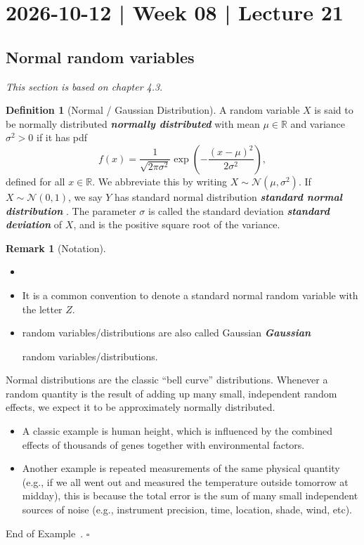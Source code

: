\documentclass[10pt]{article}
\theoremstyle{definition}
\newtheorem{definition}[theorem]{Definition}
\newtheorem{remark}[theorem]{Remark}
\newtheorem{example}[theorem]{Example}
\renewenvironment{example}
{\begin{oldexample}}
  {\par\smallskip\hfill   End of Example~\theexample. $\square$    \par\end{oldexample}}
\newcommand{\1}[1]{\textbf{1}_{\left[#1\right]}} %
\def\R{\mathbb{R}} %
\DeclareRobustCommand{\demph}[1]{%
  \ifmmode
  {\color{Blue}#1}%
  \else
  {\color{Blue}\bfseries\slshape #1}%
  \fi
}
\begin{document}
\newpage
\section{2026-10-12 | Week 08 | Lecture 21}


\subsection{Normal random variables}
\textit{This section is based on chapter 4.3}.


\begin{definition}[Normal / Gaussian Distribution]
  \label{def:gaussian-distribution}
  A random variable $X$ is said to be \demph{normally distributed} with mean
  $\mu\in \R$ and variance $\sigma^{2}>0$ if it has pdf
  \begin{equation*}
    f(x) = \frac{1}{\sqrt{2\pi\sigma^{2}}}
    \exp\left(-\frac{(x-\mu)^{2}}{2\sigma^{2}} \right),
  \end{equation*}
  defined for all $x\in \R$. We abbreviate this by writing
  $X\sim \mathcal{N}(\mu,\sigma^{2})$. If $X\sim \mathcal{N}(0,1)$, we say $Y$
  has \demph{standard normal distribution}. The parameter $\sigma$ is called
  the \demph{standard deviation} of $X$, and is the positive square root of
  the variance.
\end{definition}

\begin{remark}[Notation]
  \begin{itemize}
    \item []
    \item It is a common convention to denote a standard normal random
    variable with the letter $Z$.
  
    \item random variables/distributions are also called \demph{Gaussian}
    random variables/distributions.
  \end{itemize}
\end{remark}

\begin{example}
  Normal distributions are the classic ``bell curve'' distributions. Whenever
  a random quantity is the result of adding up many small, independent random
  effects, we expect it to be approximately normally distributed.

  \begin{itemize}
    \item A classic example is human height, which is influenced by the
    combined effects of thousands of genes together with environmental
    factors.
    \item Another example is repeated measurements of the same physical
    quantity (e.g., if we all went out and measured the temperature outside
    tomorrow at midday), this is because the total error is the sum of many
    small independent sources of noise (e.g., instrument precision, time,
    location, shade, wind, etc).
  \end{itemize}
\end{example}
\end{document}
